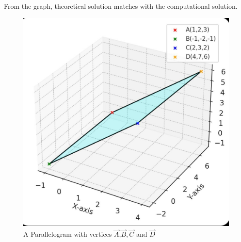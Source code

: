 \documentclass[journal,12pt,onecolumn]{IEEEtran}
\theoremstyle{remark}
\begin{document}
\vspace{1cm}
From the graph, theoretical solution matches with the computational solution.

\begin{figure}[H]
\centering
\includegraphics[width=0.8\columnwidth]{figs/graph.png}
 \caption*{A Parallelogram with vertices $\vec{A}$,$\vec{B},\vec{C}$ and $\vec{D}$}
\label{fig:graph.png}
\end{figure}
\end{document}
